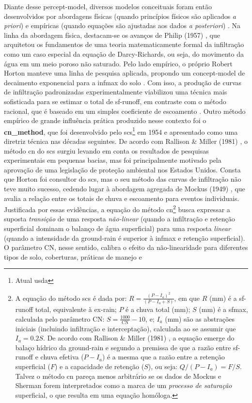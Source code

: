 \documentclass[./main.tex]{subfiles}
\begin{document}
\par Diante desse \gls{percept-model}, diversos modelos conceituais foram então desenvolvidos por abordagens físicas (quando princípios físicos são aplicados \textit{a priori}) e empíricas (quando equações são ajustadas aos dados \textit{a posteriori})  \cite{mishra2003}. Na linha da abordagem física, destacam-se os avanços de Philip (1957) \cite{philip1957}, que arquitetou os fundamentos de uma \gls{teoria} matematicamente formal da infiltração como um caso especial da equação de Darcy-Richards, ou seja, do movimento da água em um meio poroso não saturado. Pelo lado empírico, o próprio Robert Horton manteve uma linha de pesquisa aplicada, propondo um \gls{concept-model} de decaimento exponencial para a \gls{infmax} do solo \cite{Horton1939}. Com isso, a produção de curvas de infiltração padronizadas experimentalmente viabilizou uma técnica mais sofisticada para se estimar o total de \gls{sf-runoff}, em contraste com o método racional, que é baseado em um simples coeficiente de escoamento \cite{Cook1946}. Outro método empírico de grande influência prática produzido nesse contexto foi o \textbf{\gls{cn_method}}, que foi desenvolvido pelo \acrfull{scs}\footnote{Atual \acrfull{usda}} em 1954 e apresentado como uma diretriz técnica nas décadas seguintes. De acordo com Rallison \& Miller (1981) \cite{Rallison1981}, o método \acrshort{cn} do \acrshort{scs} surgiu levando em conta os resultados de pesquisas experimentais em pequenas bacias, mas foi principalmente motivado pela aprovação de uma legislação de proteção ambiental nos Estados Unidos. Consta que Horton foi consultor do \acrshort{scs}, mas o seu método das curvas de infiltração não teve muito sucesso, cedendo lugar à abordagem agregada de Mockus (1949) \cite{mockus1949}, que avalia a relação entre os totais de chuva e escoamento para eventos individuais. Justificada por essas evidências, a equação do método \acrshort{cn}\footnote{A equação do método \acrshort{scs} é dada por: $R = \frac{(P - I_a)^{2}}{(P - I_a + S)}$, em que $R$ (mm) é a \gls{sf-runoff} total, equivalente à \gls{ex-rain}; $P$ é a chuva total (mm); $S$ (mm) é a \gls{sfmax}, calculada pelo parâmetro CN: $S = \frac{1000}{\text{CN}}-10$, e; $I_a$ (mm) são as abstrações iniciais (incluindo infiltração e interceptação), calculada ao se assumir que $I_a = 0.2S$. De acordo com Rallison \& Miller (1981) \cite{Rallison1981}, a equação emerge do balaço hídrico da \gls{ground-rain} e segundo a premissa de que a razão entre \gls{sf-runoff} e chuva efetiva ($P - I_a$) é a mesma que a razão entre a retenção superficial ($F$) e a capacidade de retenção ($S$), ou seja: $Q/(P-I_a) = F/S$. Talvez o método \acrshort{cn} pareça menos arbitrário se os dados de Mockus e Sherman forem interpretados como a marca de um \textit{processo de saturação} superficial, o que resulta em uma equação homóloga.} busca expressar a suposta \textit{transição} de uma resposta \textit{não-linear} (quando a infiltração e retenção superficial dominam o balanço de água superficial) para uma resposta \textit{linear} (quando a intensidade da \gls{ground-rain} é superior à \gls{infmax} e retenção superficial). O parâmetro CN, nesse sentido, calibra o efeito da não-linearidade para diferentes tipos de solo, coberturas, práticas de manejo e 
\end{document}
